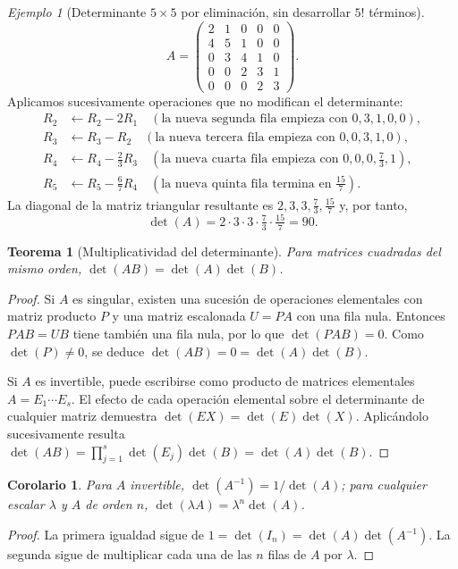\documentclass[12pt]{article}
\newtheorem{teorema}[definicion]{Teorema}
\newtheorem{corolario}[definicion]{Corolario}
\theoremstyle{remark}
\newtheorem{ejemplo}[definicion]{Ejemplo}
\begin{document}
\begin{ejemplo}[Determinante $5\times5$ por eliminación, sin desarrollar $5!$ términos]
\[
A=\begin{pmatrix}
2&1&0&0&0\\4&5&1&0&0\\0&3&4&1&0\\0&0&2&3&1\\0&0&0&2&3
\end{pmatrix}.
\]
Aplicamos sucesivamente operaciones que no modifican el determinante:
\begin{align*}
R_2&\leftarrow R_2-2R_1\quad(\text{la nueva segunda fila empieza con }0,3,1,0,0),\\
R_3&\leftarrow R_3-R_2\quad(\text{la nueva tercera fila empieza con }0,0,3,1,0),\\
R_4&\leftarrow R_4-\tfrac23R_3\quad(\text{la nueva cuarta fila empieza con }0,0,0,\tfrac73,1),\\
R_5&\leftarrow R_5-\tfrac67R_4\quad(\text{la nueva quinta fila termina en }\tfrac{15}{7}).
\end{align*}
La diagonal de la matriz triangular resultante es $2,3,3,\frac73,\frac{15}{7}$ y, por tanto,
\[
\boxed{\det(A)=2\cdot3\cdot3\cdot\tfrac73\cdot\tfrac{15}{7}=90.}
\]
\end{ejemplo}

\begin{teorema}[Multiplicatividad del determinante]
Para matrices cuadradas del mismo orden, $\det(AB)=\det(A)\det(B)$.
\end{teorema}
\begin{proof}
Si $A$ es singular, existen una sucesión de operaciones elementales con matriz producto $P$ y una matriz escalonada $U=PA$ con una fila nula. Entonces $PAB=UB$ tiene también una fila nula, por lo que $\det(PAB)=0$. Como $\det(P)\ne0$, se deduce $\det(AB)=0=\det(A)\det(B)$.

Si $A$ es invertible, puede escribirse como producto de matrices elementales $A=E_1\cdots E_s$. El efecto de cada operación elemental sobre el determinante de cualquier matriz demuestra $\det(EX)=\det(E)\det(X)$. Aplicándolo sucesivamente resulta $\det(AB)=\prod_{j=1}^s\det(E_j)\det(B)=\det(A)\det(B)$.
\end{proof}
\begin{corolario}
Para $A$ invertible, $\det(A^{-1})=1/\det(A)$; para cualquier escalar $\lambda$ y $A$ de orden $n$, $\det(\lambda A)=\lambda^n\det(A)$.
\end{corolario}
\begin{proof}
La primera igualdad sigue de $1=\det(I_n)=\det(A)\det(A^{-1})$. La segunda sigue de multiplicar cada una de las $n$ filas de $A$ por $\lambda$.
\end{proof}
\end{document}
